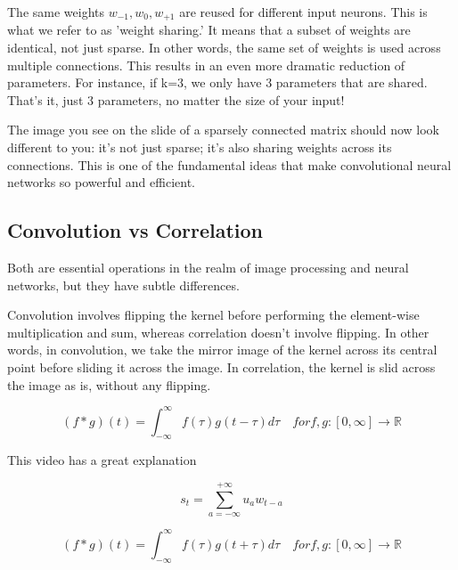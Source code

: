 \documentclass[11pt]{article}
\begin{document}
The same weights $w_{-1},w_0,w_{+1}$ are reused for different input neurons. This is what we refer to as 'weight sharing.' It means that a subset of weights are identical, not just sparse. In other words, the same set of weights is used across multiple connections. This results in an even more dramatic reduction of parameters. For instance, if k=3, we only have 3 parameters that are shared. That's it, just 3 parameters, no matter the size of your input!

The image you see on the slide of a sparsely connected matrix should now look different to you: it's not just sparse; it's also sharing weights across its connections. This is one of the fundamental ideas that make convolutional neural networks so powerful and efficient.

\subsection{Convolution vs Correlation}

Both are essential operations in the realm of image processing and neural networks, but they have subtle differences.

Convolution involves flipping the kernel before performing the element-wise multiplication and sum, whereas correlation doesn't involve flipping. In other words, in convolution, we take the mirror image of the kernel across its central point before sliding it across the image. In correlation, the kernel is slid across the image as is, without any flipping.

\begin{definition}
    \begin{equation}
        (f \ast g)(t) = \int^\infty_{-\infty} f(\tau)g(t-\tau) d\tau \quad for f,g:[0,\infty] \rightarrow \mathbb{R}
    \end{equation}
\end{definition}

This video has a great explanation~\cite{youtubeConvolutionsProbability}

\begin{definition}
    \begin{equation}
        s_t = \sum_{a=-\infty}^{+\infty}u_a w_{t-a}
    \end{equation}
\end{definition}

\begin{definition}[Correlation]
    \begin{equation}
        (f \ast g)(t) = \int^\infty_{-\infty} f(\tau)g(t+\tau) d\tau \quad for f,g:[0,\infty] \rightarrow \mathbb{R}
    \end{equation}
\end{definition}
\end{document}
